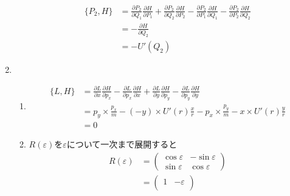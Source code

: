 \documentclass{jsarticle}
\begin{document}
\begin{enumerate}
\begin{enumerate}
$$\begin{aligned}
                    \{P_2, H\} & = \frac{\partial P_2}{\partial Q_1}\frac{\partial H}{\partial P_1}
                    +\frac{\partial P_2}{\partial Q_2}\frac{\partial H}{\partial P_2}
                    - \frac{\partial P_2}{\partial P_1}\frac{\partial H}{\partial Q_1}
                    - \frac{\partial P_2}{\partial P_2}\frac{\partial H}{\partial Q_2}              \\
                               & = - \frac{\partial H}{\partial Q_2}                                \\
                               & = -U'(Q_2)
                  \end{aligned}
                $$
        \end{enumerate}
  \item
        \begin{enumerate}
          \item
                $$
                  \begin{aligned}
                    \{L, H\} & =
                    \frac{\partial L}{\partial x}\frac{\partial H}{\partial p_x}
                    -\frac{\partial L}{\partial p_x}\frac{\partial H}{\partial x}
                    +\frac{\partial L}{\partial y}\frac{\partial H}{\partial p_y}
                    -\frac{\partial L}{\partial p_y}\frac{\partial H}{\partial y}         \\
                             & = p_y \times \frac{p_x }{m} - (-y) \times U'(r)\frac{x}{r}
                    - p_x \times \frac{p_y }{m} - x \times  U'(r)\frac{y}{r}              \\
                             & = 0
                  \end{aligned}
                $$
          \item $R(\varepsilon)$を$\varepsilon$について一次まで展開すると
                $$
                  \begin{aligned}
                    R(\varepsilon) & = \begin{pmatrix}
                                         \cos \varepsilon & -\sin \varepsilon \\
                                         \sin \varepsilon & \cos \varepsilon
                                       \end{pmatrix}             \\
                                   & = \begin{pmatrix}
                                         1           & - \varepsilon \\

\end{pmatrix}
\end{aligned}$$
\end{enumerate}
\end{enumerate}
\end{document}
